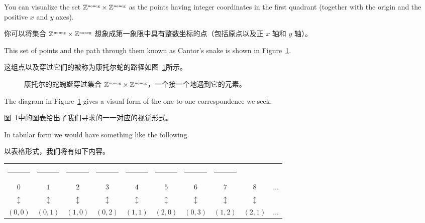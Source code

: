 You can visualize the set $\Naturals \times \Naturals$ as the
points having integer coordinates
in the first quadrant (together with the origin and the positive
$x$ and $y$ axes).

你可以将集合 $\Naturals \times \Naturals$ 想象成第一象限中具有整数坐标的点（包括原点以及正 $x$ 轴和 $y$ 轴）。

This set of points and the path through them known as Cantor's snake is
shown in Figure~\ref{fig:cantors_snake_2}.

这组点以及穿过它们的被称为康托尔蛇的路径如图~\ref{fig:cantors_snake_2}所示。

\begin{figure}[!btp]
    
    \caption[Cantor's snake.]{Cantor's snake winds through the set %
        $\Naturals \times \Naturals$ encountering its
        elements one after the other.}
    \caption[康托尔的蛇。]{康托尔的蛇蜿蜒穿过集合 %
        $\Naturals \times \Naturals$，一个接一个地遇到它的元素。}
    \label{fig:cantors_snake_2}
\end{figure}

The diagram in Figure~\ref{fig:cantors_snake_2} gives a visual form of the one-to-one correspondence
we seek.

图~\ref{fig:cantors_snake_2}中的图表给出了我们寻求的一一对应的视觉形式。

In tabular form we would have something like the following.

以表格形式，我们将有如下内容。

\medskip

\begin{tabular}{cccccccccc}
    \rule{32pt}{0pt} & \rule{32pt}{0pt} & \rule{32pt}{0pt} & \rule{32pt}{0pt} & \rule{32pt}{0pt} & \rule{32pt}{0pt} & \rule{32pt}{0pt} & \rule{32pt}{0pt}                             \\
    $0$              & $1$              & $2$              & $3$              & $4$              & $5$              & $6$              & $7$              & $8$            & $\ldots$ \\
    $\updownarrow$   & $\updownarrow$   & $\updownarrow$   & $\updownarrow$   & $\updownarrow$   & $\updownarrow$   & $\updownarrow$   & $\updownarrow$   & $\updownarrow$ &          \\
    $(0, 0)$         & $(0, 1)$         & $(1, 0)$         & $(0, 2)$         & $(1, 1)$         & $(2, 0)$         & $(0, 3)$         & $(1,2)$          & $(2, 1)$       & $\ldots$ \\
\end{tabular}
\medskip

